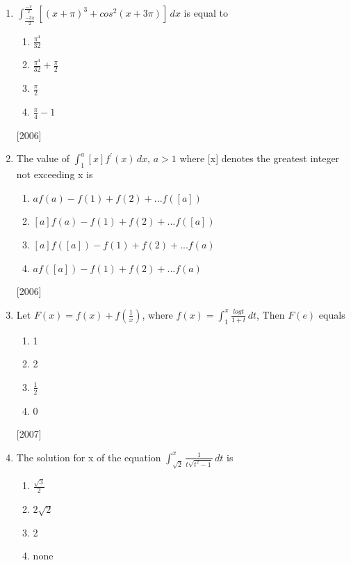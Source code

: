 \documentclass[journal,12pt,twocolumn]{IEEEtran}
\theoremstyle{remark}
\begin{document}
\begin{enumerate}
\begin{enumerate}
		         \item $\frac{\pi}{2} (\int_{0}^{\frac{\pi}{2}} f(sinx) \,dx)$
		         \item $\pi (\int_{0}^{\frac{\pi}{2}} f(cosx) \,dx)$
		    \end{enumerate}
		    \hfill [2006] 
	     \item
		    $\int_{\frac{-3\pi}{2}}^{\frac{-\pi}{2}} [(x+\pi)^{3}+cos^{2}(x+3\pi)] \,dx$ is equal to
		   \begin{enumerate}
		        \item $\frac{\pi^{4}}{32}$
		        \item $\frac{\pi^{4}}{32}+\frac{\pi}{2}$
		        \item $\frac{\pi}{2}$
		        \item $\frac{\pi}{4}-1$
		   \end{enumerate}
		   \hfill [2006] 
	    \item 
		    The value of $\int_{1}^{a} [x]f^{'}(x) \,dx$, $a>1$ where [x] denotes the greatest integer not exceeding x is
		   \begin{enumerate}
		       \item $af(a)-{f(1)+f(2)+...f([a])}$
		       \item $[a]f(a)-{f(1)+f(2)+...f([a])}$
		       \item $[a]f([a])-{f(1)+f(2)+...f(a)}$
		       \item $af([a])-{f(1)+f(2)+...f(a)}$
		   \end{enumerate}
		   \hfill [2006] 
	   \item 
		    Let $F(x)=f(x)+f(\frac{1}{x})$, where $f(x)=\int_{1}^{x} \frac{logt}{1+t} \,dt$, Then $F(e)$ equals
		   \begin{enumerate}
		      \item 1
		      \item 2
		      \item $\frac{1}{2}$
		      \item 0
		   \end{enumerate}
		   \hfill [2007] 
	   \item 
    		    The solution for x of the equation $\int_{\sqrt2}^{x} \frac{1}{t\sqrt{t^{2}-1}} \,dt$ is
		   \begin{enumerate}
		      \item $\frac{\sqrt{3}}{2}$
		      \item $2\sqrt{2}$
		      \item 2
		      \item none
		   \end{enumerate}

\end{enumerate}
\end{document}
